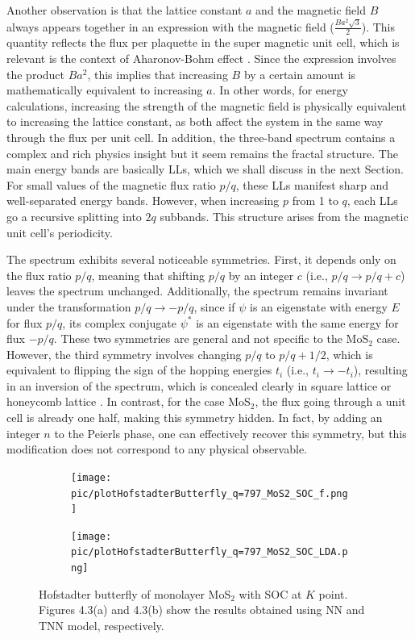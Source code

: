 Another observation is that the lattice constant $a$ and the magnetic field $B$ always appears together in an expression with the magnetic field ($\tfrac{Ba^{2}\sqrt{3}}{2}$). This quantity reflects the flux per plaquette in the super magnetic unit cell, which is relevant is the context of Aharonov-Bohm effect \cite{aharonov1959}. Since the expression involves the product $Ba^{2}$, this implies that increasing $B$ by a certain amount is mathematically equivalent to increasing $a$. In other words, for energy calculations, increasing the strength of the magnetic field is physically equivalent to increasing the lattice constant, as both affect the system in the same way through the flux per unit cell. In addition, the three-band spectrum contains a complex and rich physics insight but it seem remains the fractal structure. The main energy bands are basically \acp{LL}, which we shall discuss in the next Section. For small values of the magnetic flux ratio $p/q$, these \acp{LL} manifest sharp and well-separated energy bands. However, when increasing $p$ from 1 to $q$, each \acp{LL} go a recursive splitting into $2q$ subbands. This structure arises from the magnetic unit cell's periodicity.

The spectrum exhibits several noticeable symmetries. First, it depends only on the flux ratio $p/q$, meaning that shifting $p/q$ by an integer $c$ (i.e., $p/q \rightarrow p/q + c$) leaves the spectrum unchanged. Additionally, the spectrum remains invariant under the transformation $p/q \rightarrow -p/q$, since if $\psi$ is an eigenstate with energy $E$ for flux $p/q$, its complex conjugate $\psi^*$ is an eigenstate with the same energy for flux $-p/q$. These two symmetries are general and not specific to the MoS$_{2}$ case. However, the third symmetry involves changing $p/q$ to $p/q + 1/2$, which is equivalent to flipping the sign of the hopping energies $t_{i}$ (i.e., $t_{i} \rightarrow -t_{i}$), resulting in an inversion of the spectrum, which is concealed clearly in square lattice \cite{PhysRevB.14.2239} or honeycomb lattice \cite{rammal1985}. In contrast, for the case MoS$_{2}$, the flux going through a unit cell is already one half, making this symmetry hidden. In fact, by adding an integer $n$ to the Peierls phase, one can effectively recover this symmetry, but this modification does not correspond to any physical observable.

\begin{figure}[htb]
	\begin{subfigure}[b]{0.495\textwidth}
		\centering
		\texttt{[image: pic/plotHofstadterButterfly\_q=797\_MoS2\_SOC\_f.png]}
	\end{subfigure}
	\begin{subfigure}[b]{0.495\textwidth}
		\centering
		\texttt{[image: pic/plotHofstadterButterfly\_q=797\_MoS2\_SOC\_LDA.png]}
	\end{subfigure}
	\caption[Hofstadter butterfly of monolayer MoS$_{2}$ with SOC in the presence of magnetic field.]{Hofstadter butterfly of monolayer MoS$_{2}$ with SOC at $K$ point. Figures 4.3(a) and 4.3(b) show the results obtained using \ac{NN} and \ac{TNN} model, respectively. }
\end{figure}

